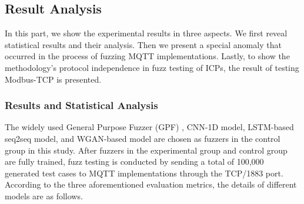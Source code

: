 
\subsection{Result Analysis}
In this part, we show the experimental results in three aspects. We first reveal statistical results and their analysis. Then we present a special anomaly that occurred in the process of fuzzing MQTT implementations. Lastly, to show the methodology’s protocol independence in fuzz testing of ICPs, the result of testing Modbus-TCP is presented.

\subsubsection{Results and Statistical Analysis}
The widely used General Purpose Fuzzer (GPF) \cite{demott2007revolutionizing}, CNN-1D model, LSTM-based seq2seq model, and WGAN-based model are chosen as fuzzers in the control group in this study. After fuzzers in the experimental group and control group are fully trained, fuzz testing is conducted by sending a total of 100,000 generated test cases to MQTT implementations through the TCP/1883 port. According to the three aforementioned evaluation metrics, the details of different models are as follows. 


